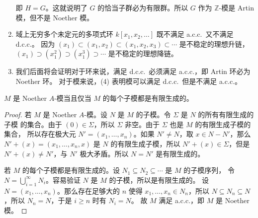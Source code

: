 \begin{example}
\begin{enumerate}
    即 $H=G$。这就说明了 $G$ 的恰当子群必为有限群。所以 $G$ 作为 $\mathbb{Z}$-模是 Artin 模，但不是
    Noether 模。
    \item 域上无穷多个未定元的多项式环 $k[x_1,x_2,\dots]$ 既不满足 a.c.c.\ 又不满足 d.c.c.。
    因为 $(x_1)\subset (x_1,x_2)\subset (x_1,x_2,x_3)\subset\cdots$ 是不稳定的理想升链，
    $(x_1)\supset (x_1^2)\supset (x_1^3)\supset\cdots$ 是不稳定的理想降链。
    \item 我们后面将会证明对于环来说，满足 d.c.c.\ 必须满足 a.c.c.，即 Artin 环必为 Noether 环。
    对于模来说，(4) 表明模可以满足 d.c.c.\ 但是不满足 a.c.c.。
  \end{enumerate}
\end{example}

\begin{proposition}\label{prop:equiv condition of Noether}
  $M$ 是 Noether $A$-模当且仅当 $M$ 的每个子模都是有限生成的。
\end{proposition}
\begin{proof}
  若 $M$ 是 Noether $A$-模。设 $N$ 是 $M$ 的子模。令 $\Sigma$ 是 $N$ 的所有有限生成的子模
  的集合。由于 $(0)\in \Sigma$，所以 $\Sigma$ 非空。由于 $\Sigma$ 也是 $M$ 的有限生成子模的集合，
  所以存在极大元 $N'=(x_1,\dots,x_n)$。如果 $N'\neq N$，取 $x\in N-N'$，那么 $N'+(x)=(x_1,\dots,x_n,x)$
  是 $N$ 的有限生成子模，所以 $N'+(x)\in\Sigma$，但是 $N'+(x)\neq N'$，与 $N'$ 极大矛盾。所以
  $N=N'$ 是有限生成的。

  若 $M$ 的每个子模都是有限生成的。设 $N_1\subseteq N_2\subseteq \cdots$ 是 $M$ 的子模序列，
  令 $N=\bigcup_{i=1}^\infty N_i$。容易验证 $N$ 是 $M$ 的子模，所以是有限生成的。
  设 $N=(x_1,\dots,x_n)$。那么存在足够大的 $n$ 使得 $x_1,\dots,x_n\in N_n$，所以
  $N\subseteq N_n\subseteq N$，所以 $N_n=N$，于是 $i\geq n$ 时有 $N_i=N$。
  故 $M$ 满足 a.c.c.，即 $M$ 是 Noether 模。
\end{proof}
  
